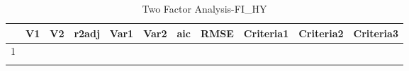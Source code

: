 \begin{longtable}{rllrrrrrlll}
  \hline
 & V1 & V2 & r2adj & Var1 & Var2 & aic & RMSE & Criteria1 & Criteria2 & Criteria3 \\ 
  \hline
1 &  &  &  &  &  &  &  &  &  &  \\ 
   \hline
\hline
\caption{Two Factor Analysis-FI_HY} 
\end{longtable}
